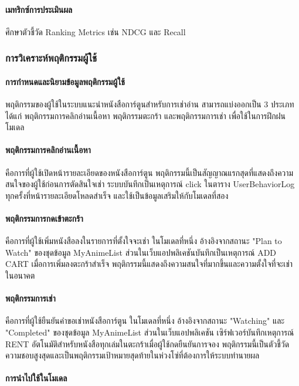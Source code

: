 \paragraph{เมทริกซ์การประเมินผล}
ศึกษาตัวชี้วัด Ranking Metrics เช่น NDCG และ Recall

\subsubsection{การวิเคราะห์พฤติกรรมผู้ใช้}

\paragraph{การกำหนดและนิยามข้อมูลพฤติกรรมผู้ใช้}
พฤติกรรมของผู้ใช้ในระบบแนะนำหนังสือการ์ตูนสำหรับการเช่าอ่าน สามารถแบ่งออกเป็น 3 ประเภท ได้แก่ พฤติกรรมการคลิกอ่านเนื้อหา พฤติกรรมตะกร้า และพฤติกรรมการเช่า เพื่อใช้ในการฝึกฝนโมเดล

\paragraph{พฤติกรรมการคลิกอ่านเนื้อหา}
คือการที่ผู้ใช้เปิดหน้ารายละเอียดของหนังสือการ์ตูน พฤติกรรมนี้เป็นสัญญาณแรกสุดที่แสดงถึงความสนใจของผู้ใช้ก่อนการตัดสินใจเช่า ระบบบันทึกเป็นเหตุการณ์ click ในตาราง UserBehaviorLog ทุกครั้งที่หน้ารายละเอียดโหลดสำเร็จ และใช้เป็นข้อมูลเสริมให้กับโมเดลที่สอง

\paragraph{พฤติกรรมการกดเข้าตะกร้า}
คือการที่ผู้ใช้เพิ่มหนังสือลงในรายการที่ตั้งใจจะเช่า ในโมเดลที่หนึ่ง อ้างอิงจากสถานะ "Plan to Watch" ของชุดข้อมูล MyAnimeList ส่วนในเว็บแอปพลิเคชันบันทึกเป็นเหตุการณ์ ADD CART เมื่อการเพิ่มลงตะกร้าสำเร็จ พฤติกรรมนี้แสดงถึงความสนใจที่มากขึ้นและความตั้งใจที่จะเช่าในอนาคต

\paragraph{พฤติกรรมการเช่า}
คือการที่ผู้ใช้ยืนยันคำขอเช่าหนังสือการ์ตูน ในโมเดลที่หนึ่ง อ้างอิงจากสถานะ "Watching" และ "Completed" ของชุดข้อมูล MyAnimeList ส่วนในเว็บแอปพลิเคชัน เซิร์ฟเวอร์บันทึกเหตุการณ์ RENT อัตโนมัติสำหรับหนังสือทุกเล่มในตะกร้าเมื่อผู้ใช้กดยืนยันการจอง พฤติกรรมนี้เป็นตัวชี้วัดความชอบสูงสุดและเป็นพฤติกรรมเป้าหมายสุดท้ายในห่วงโซ่ที่ต้องการให้ระบบทำนายผล

\paragraph{การนำไปใช้ในโมเดล}

